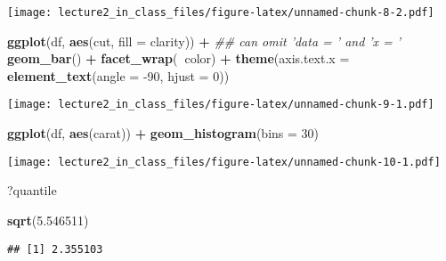 \documentclass[]{article}
\newenvironment{Shaded}{\begin{snugshade}}{\end{snugshade}}
\newcommand{\CommentTok}[1]{\textcolor[rgb]{0.56,0.35,0.01}{\textit{#1}}}
\newcommand{\DataTypeTok}[1]{\textcolor[rgb]{0.13,0.29,0.53}{#1}}
\newcommand{\DecValTok}[1]{\textcolor[rgb]{0.00,0.00,0.81}{#1}}
\newcommand{\FloatTok}[1]{\textcolor[rgb]{0.00,0.00,0.81}{#1}}
\newcommand{\KeywordTok}[1]{\textcolor[rgb]{0.13,0.29,0.53}{\textbf{#1}}}
\newcommand{\NormalTok}[1]{#1}
\newcommand{\OperatorTok}[1]{\textcolor[rgb]{0.81,0.36,0.00}{\textbf{#1}}}
\newcommand{\StringTok}[1]{\textcolor[rgb]{0.31,0.60,0.02}{#1}}
\begin{document}
\texttt{[image: lecture2\_in\_class\_files/figure-latex/unnamed-chunk-8-2.pdf]}

\begin{Shaded}
\begin{Highlighting}[]
\KeywordTok{ggplot}\NormalTok{(df, }\KeywordTok{aes}\NormalTok{(cut, }\DataTypeTok{fill =}\NormalTok{ clarity)) }\OperatorTok{+}\StringTok{ }\CommentTok{## can omit 'data = ' and 'x = '}
\StringTok{  }\KeywordTok{geom_bar}\NormalTok{() }\OperatorTok{+}
\StringTok{  }\KeywordTok{facet_wrap}\NormalTok{(}\OperatorTok{~}\NormalTok{color) }\OperatorTok{+}
\StringTok{  }\KeywordTok{theme}\NormalTok{(}\DataTypeTok{axis.text.x =} \KeywordTok{element_text}\NormalTok{(}\DataTypeTok{angle =} \DecValTok{-90}\NormalTok{, }\DataTypeTok{hjust =} \DecValTok{0}\NormalTok{))}
\end{Highlighting}
\end{Shaded}

\texttt{[image: lecture2\_in\_class\_files/figure-latex/unnamed-chunk-9-1.pdf]}

\begin{Shaded}
\begin{Highlighting}[]
\KeywordTok{ggplot}\NormalTok{(df, }\KeywordTok{aes}\NormalTok{(carat)) }\OperatorTok{+}
\StringTok{  }\KeywordTok{geom_histogram}\NormalTok{(}\DataTypeTok{bins =} \DecValTok{30}\NormalTok{)}
\end{Highlighting}
\end{Shaded}

\texttt{[image: lecture2\_in\_class\_files/figure-latex/unnamed-chunk-10-1.pdf]}

\begin{Shaded}
\begin{Highlighting}[]
\NormalTok{?quantile}

\KeywordTok{sqrt}\NormalTok{(}\FloatTok{5.546511}\NormalTok{)}
\end{Highlighting}
\end{Shaded}

\begin{verbatim}
## [1] 2.355103
\end{verbatim}
\end{document}

